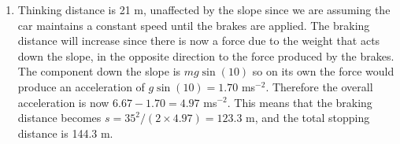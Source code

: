 \begin{problem}[A1989PIIQ9l]
{\begin{enumerate}
\begin{enumerate}
\end{enumerate}
\item Thinking distance is 21 m, unaffected by the slope since we are assuming the car maintains a constant speed until the brakes are applied. The braking distance will increase since there is now a force due to the weight that acts down the slope, in the opposite direction to the force produced by the brakes. The component down the slope is $mg\sin(10)$ so on its own the force would produce an acceleration of $g\sin(10)=1.70$ ms$^{-2}$. Therefore the overall acceleration is now $6.67-1.70=4.97$ ms$^{-2}$. This means that the braking distance becomes $s=35^2/(2\times4.97)=123.3$ m, and the total stopping distance is 144.3 m. 
\end{enumerate}
}
\end{problem}